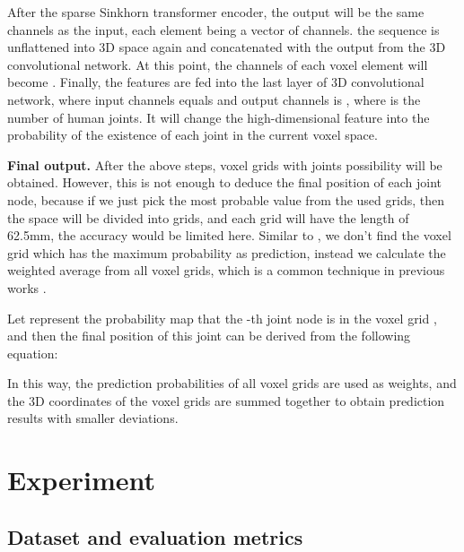 \documentclass[lettersize,journal]{IEEEtran}
\begin{document}
\par After the sparse Sinkhorn transformer encoder, the output  will be the same channels as the input, each element being a vector of  channels. the sequence is unflattened into 3D space again and concatenated with the output from the 3D convolutional network. At this point, the channels of each voxel element will become . Finally, the features are fed into the last layer of 3D convolutional network, where input channels equals  and output channels is , where  is the number of human joints. It will change the high-dimensional feature into the probability of the existence of each joint in the current voxel space.


\par\textbf{Final output.}
After the above steps, voxel grids with joints possibility will be obtained. However, this is not enough to deduce the final position of each joint node, because if we just pick the most probable value from the used grids, then the  space will be divided into   grids, and each grid will have the length of 62.5mm, the accuracy would be limited here. Similar to \cite{tu2020voxelpose}, we don't find the voxel grid which has the maximum probability as prediction, instead we calculate the weighted average from all voxel grids, which is a common technique in previous works \cite{sun2018integral}.


\par Let  represent the probability map that the -th joint node is in the voxel grid , and then the final position of this joint can be derived from the following equation:



\par In this way, the prediction probabilities of all voxel grids are used as weights, and the 3D coordinates of the voxel grids are summed together to obtain prediction results with smaller deviations.








\section{Experiment}
\subsection{Dataset and evaluation metrics}
\end{document}
